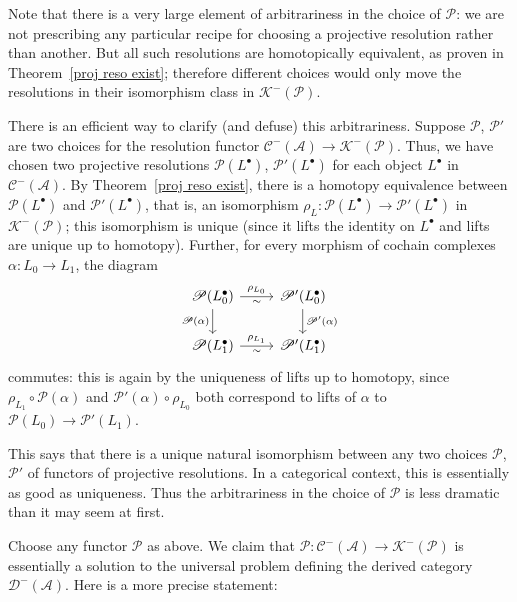 Note that there is a very large element of arbitrariness in the choice of $\mathscr{P}$: we are not prescribing any particular recipe for choosing a projective 
resolution rather than another. But all such resolutions are homotopically equivalent, as proven in Theorem~\ref{proj reso exist}; therefore different choices would 
only move the resolutions in their isomorphism class in $\mathcal{K}^-(\mathcal{P})$.
\begin{remark}
There is an efficient way to clarify (and defuse) this arbitrariness. Suppose $\mathscr{P}$, $\mathscr{P}'$ are two choices for the resolution functor 
$\mathcal{C}^-(\mathcal{A})\to\mathcal{K}^-(\mathcal{P})$. Thus, we have chosen two projective resolutions $\mathscr{P}(L^\bullet)$, $\mathscr{P}'(L^\bullet)$ 
for each object $L^\bullet$ in $\mathcal{C}^-(\mathcal{A})$. By Theorem~\ref{proj reso exist}, there is a homotopy equivalence between $\mathscr{P}(L^\bullet)$ 
and $\mathscr{P}'(L^\bullet)$, that is, an isomorphism $\rho_L: \mathscr{P}(L^\bullet)\to\mathscr{P}'(L^\bullet)$ in $\mathcal{K}^-(\mathcal{P})$; this isomorphism 
is unique (since it lifts the identity on $L^\bullet$ and lifts are unique up to homotopy). Further, for every morphism of cochain complexes $\alpha:L_0\to L_1$, the 
diagram
\[\begin{tikzcd}
\mathscr{P}(L_0^\bullet)\ar[d,swap,"\mathscr{P}(\alpha)"]\ar[r,"\rho_{L_0}","\sim"']&\mathscr{P}'(L_0^\bullet)\ar[d,"\mathscr{P}'(\alpha)"]\\
\mathscr{P}(L_1^\bullet)\ar[r,"\rho_{L_1}","\sim"']&\mathscr{P}'(L_1^\bullet)
\end{tikzcd}\]
commutes: this is again by the uniqueness of lifts up to homotopy, since $\rho_{L_1}\circ\mathscr{P}(\alpha)$
and $\mathscr{P}'(\alpha)\circ\rho_{L_0}$ both correspond to lifts of $\alpha$ to $\mathscr{P}(L_0)\to\mathscr{P}'(L_1)$.\par
This says that there is a unique natural isomorphism between any two choices $\mathscr{P}$, $\mathscr{P}'$ of functors of projective resolutions. In a categorical context, this is essentially
as good as uniqueness. Thus the arbitrariness in the choice of $\mathscr{P}$ is less dramatic than it may seem at first.
\end{remark}
Choose any functor $\mathscr{P}$ as above. We claim that $\mathscr{P}:\mathcal{C}^-(\mathcal{A})\to\mathscr{K}^-(\mathscr{P})$ is
essentially a solution to the universal problem defining the derived category $\mathcal{D}^-(\mathcal{A})$. Here is a more precise statement:
